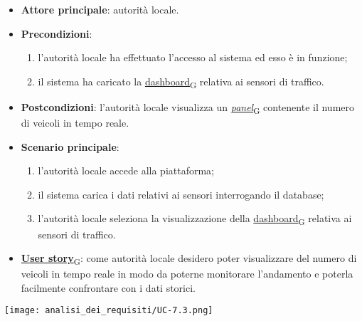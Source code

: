 \begin{itemize}
	\item \textbf{Attore principale}: autorità locale.
	\item \textbf{Precondizioni}:
	      \begin{enumerate}
		      \item l'autorità locale ha effettuato l'accesso al sistema ed esso è in funzione;
		      \item il sistema ha caricato la \href{https://7last.github.io/docs/pb/documentazione-interna/glossario\#dashboard}{dashboard\textsubscript{G}} relativa ai sensori di traffico.
	      \end{enumerate}
	\item \textbf{Postcondizioni}: l'autorità locale visualizza un \href{https://7last.github.io/docs/pb/documentazione-interna/glossario\#panel}{\textit{panel}\textsubscript{G}} contenente il numero di veicoli in tempo reale.
	\item \textbf{Scenario principale}:
	      \begin{enumerate}
		      \item l'autorità locale accede alla piattaforma;
		      \item il sistema carica i dati relativi ai sensori interrogando il database;
		      \item l'autorità locale seleziona la visualizzazione della \href{https://7last.github.io/docs/pb/documentazione-interna/glossario\#dashboard}{dashboard\textsubscript{G}} relativa ai sensori di traffico.
	      \end{enumerate}
	\item \href{https://7last.github.io/docs/pb/documentazione-interna/glossario\#user-story}{\textbf{User story}\textsubscript{G}}:
	      come autorità locale desidero poter visualizzare del numero di veicoli in tempo reale in modo da poterne monitorare l'andamento
	      e poterla facilmente confrontare con i dati storici.
\end{itemize}
\begin{center}
	\texttt{[image: analisi\_dei\_requisiti/UC-7.3.png]}
\end{center}



